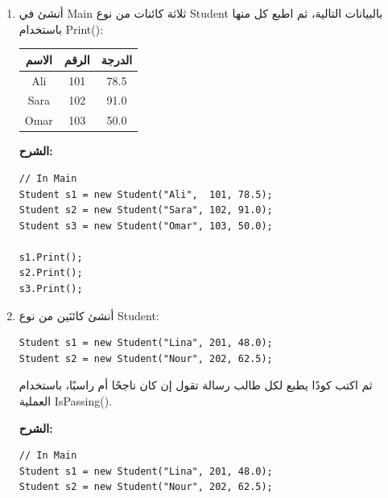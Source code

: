 \documentclass[14pt]{extarticle}
\begin{document}
\begin{enumerate}

\item %

أنشئ في \textenglish{Main} ثلاثة كائنات من نوع \textenglish{Student} بالبيانات التالية، ثم اطبع كل منها باستخدام \textenglish{Print()}:

\begin{center}
\begin{tabular}{|c|c|c|}
\hline
\textbf{الاسم} & \textbf{الرقم} & \textbf{الدرجة} \\
\hline
\textenglish{Ali}  & \textenglish{101} & \textenglish{78.5} \\
\textenglish{Sara} & \textenglish{102} & \textenglish{91.0} \\
\textenglish{Omar} & \textenglish{103} & \textenglish{50.0} \\
\hline
\end{tabular}
\end{center}

\ifwithsols
\textbf{الشرح:}
\begin{english}
\begin{verbatim}
// In Main
Student s1 = new Student("Ali",  101, 78.5);
Student s2 = new Student("Sara", 102, 91.0);
Student s3 = new Student("Omar", 103, 50.0);

s1.Print();
s2.Print();
s3.Print();
\end{verbatim}
\end{english}
\clearpage
\fi

\item %

أنشئ كائنَين من نوع \textenglish{Student}:

\begin{english}
\begin{verbatim}
Student s1 = new Student("Lina", 201, 48.0);
Student s2 = new Student("Nour", 202, 62.5);
\end{verbatim}
\end{english}

ثم اكتب كودًا يطبع لكل طالب رسالة تقول إن كان ناجحًا أم راسبًا، باستخدام العملية \textenglish{IsPassing()}.

\ifwithsols
\textbf{الشرح:}
\begin{english}
\begin{verbatim}
// In Main
Student s1 = new Student("Lina", 201, 48.0);
Student s2 = new Student("Nour", 202, 62.5);


\end{verbatim}
\end{english}
\end{enumerate}
\end{document}
